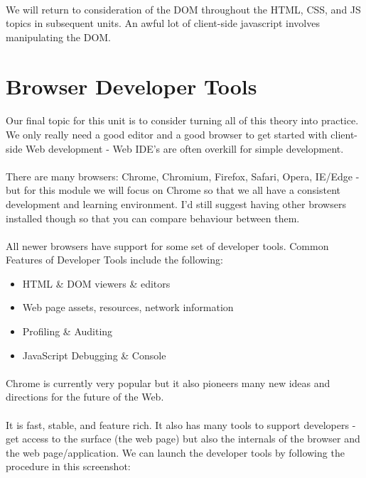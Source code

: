 \documentclass[12pt, a4paper, oneside]{book}
\begin{document}
\paragraph{} We will return to consideration of the DOM throughout the HTML, CSS, and JS topics in subsequent units. An awful lot of client-side javascript involves manipulating the DOM.

\section{Browser Developer Tools}
\paragraph{} Our final topic for this unit is to consider turning all of this theory into practice. We only really need a good editor and a good browser to get started with client-side Web development - Web IDE’s are often overkill for simple development.
\paragraph{} There are many browsers: Chrome, Chromium, Firefox, Safari, Opera, IE/Edge - but for this module we will focus on Chrome so that we all have a consistent development and learning environment. I'd still suggest having other browsers installed though so that you can compare behaviour between them.

\paragraph{} All newer browsers have support for some set of developer tools. Common Features of Developer Tools include the following:
\begin{itemize}
\item HTML \& DOM viewers \& editors
\item Web page assets, resources, network information 
\item Profiling \& Auditing
\item JavaScript Debugging \& Console 
\end{itemize}

\paragraph{} Chrome is currently very popular but it also pioneers many new ideas and directions for the future of the Web.
\paragraph{} It is fast, stable, and feature rich. It also has many tools to support developers - get access to the surface (the web page) but also the internals of the browser and the web page/application. We can launch the developer tools by following the procedure in this screenshot:
\end{document}
